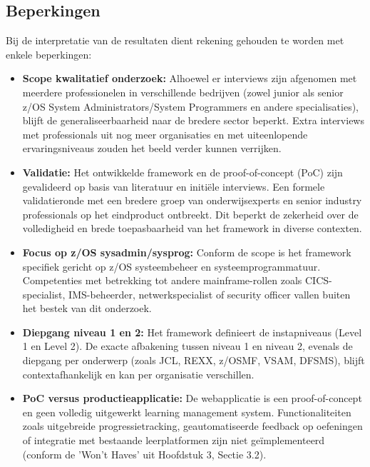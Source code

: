 \subsection{Beperkingen}

Bij de interpretatie van de resultaten dient rekening gehouden te worden met enkele beperkingen:

\begin{itemize}
	
\item \textbf{Scope kwalitatief onderzoek:} 
Alhoewel er interviews zijn afgenomen met meerdere professionelen in verschillende bedrijven (zowel junior als senior z/OS System Administrators/System Programmers en andere specialisaties), blijft de generaliseerbaarheid naar de bredere sector beperkt. Extra interviews met professionals uit nog meer organisaties en met uiteenlopende ervaringsniveaus zouden het beeld verder kunnen verrijken.
	
	\item \textbf{Validatie:} 
	Het ontwikkelde framework en de proof-of-concept (PoC) zijn gevalideerd op basis van literatuur en initiële interviews. Een formele validatieronde met een bredere groep van onderwijsexperts en senior industry professionals op het eindproduct ontbreekt. Dit beperkt de zekerheid over de volledigheid en brede toepasbaarheid van het framework in diverse contexten.
	
	\item \textbf{Focus op z/OS sysadmin/sysprog:} 
	Conform de scope is het framework specifiek gericht op z/OS systeembeheer en systeemprogrammatuur. Competenties met betrekking tot andere mainframe-rollen zoals CICS-specialist, IMS-beheerder, netwerkspecialist of security officer vallen buiten het bestek van dit onderzoek.
	
	\item \textbf{Diepgang niveau 1 en 2:} 
	Het framework definieert de instapniveaus (Level 1 en Level 2). De exacte afbakening tussen niveau 1 en niveau 2, evenals de diepgang per onderwerp (zoals JCL, REXX, z/OSMF, VSAM, DFSMS), blijft contextafhankelijk en kan per organisatie verschillen.
	
	\item \textbf{PoC versus productieapplicatie:} 
	De webapplicatie is een proof-of-concept en geen volledig uitgewerkt learning management system. Functionaliteiten zoals uitgebreide progressietracking, geautomatiseerde feedback op oefeningen of integratie met bestaande leerplatformen zijn niet geïmplementeerd (conform de 'Won’t Haves' uit Hoofdstuk 3, Sectie 3.2).
	
\end{itemize}

